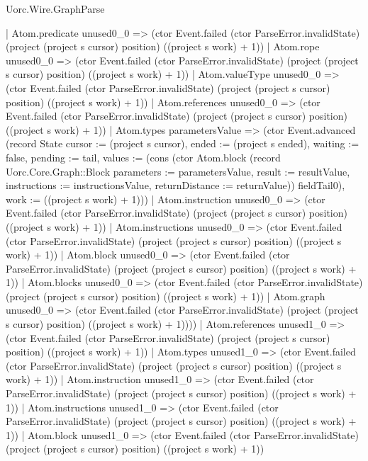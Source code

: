 \begin{lexlean}{Uorc.Wire.GraphParse}
\begin{semanticmodule}
{                      | Atom.predicate unused0_0 => (ctor Event.failed (ctor ParseError.invalidState) (project (project s cursor) position) ((project s work) + 1))
                      | Atom.rope unused0_0 => (ctor Event.failed (ctor ParseError.invalidState) (project (project s cursor) position) ((project s work) + 1))
                      | Atom.valueType unused0_0 => (ctor Event.failed (ctor ParseError.invalidState) (project (project s cursor) position) ((project s work) + 1))
                      | Atom.references unused0_0 => (ctor Event.failed (ctor ParseError.invalidState) (project (project s cursor) position) ((project s work) + 1))
                      | Atom.types parametersValue => (ctor Event.advanced (record State {cursor := (project s cursor), ended := (project s ended), waiting := false, pending := tail, values := (cons (ctor Atom.block (record Uorc.Core.Graph::Block {parameters := parametersValue, result := resultValue, instructions := instructionsValue, returnDistance := returnValue})) fieldTail0), work := ((project s work) + 1)}))
                      | Atom.instruction unused0_0 => (ctor Event.failed (ctor ParseError.invalidState) (project (project s cursor) position) ((project s work) + 1))
                      | Atom.instructions unused0_0 => (ctor Event.failed (ctor ParseError.invalidState) (project (project s cursor) position) ((project s work) + 1))
                      | Atom.block unused0_0 => (ctor Event.failed (ctor ParseError.invalidState) (project (project s cursor) position) ((project s work) + 1))
                      | Atom.blocks unused0_0 => (ctor Event.failed (ctor ParseError.invalidState) (project (project s cursor) position) ((project s work) + 1))
                      | Atom.graph unused0_0 => (ctor Event.failed (ctor ParseError.invalidState) (project (project s cursor) position) ((project s work) + 1))))
                  | Atom.references unused1_0 => (ctor Event.failed (ctor ParseError.invalidState) (project (project s cursor) position) ((project s work) + 1))
                  | Atom.types unused1_0 => (ctor Event.failed (ctor ParseError.invalidState) (project (project s cursor) position) ((project s work) + 1))
                  | Atom.instruction unused1_0 => (ctor Event.failed (ctor ParseError.invalidState) (project (project s cursor) position) ((project s work) + 1))
                  | Atom.instructions unused1_0 => (ctor Event.failed (ctor ParseError.invalidState) (project (project s cursor) position) ((project s work) + 1))
                  | Atom.block unused1_0 => (ctor Event.failed (ctor ParseError.invalidState) (project (project s cursor) position) ((project s work) + 1))
}
\end{semanticmodule}
\end{lexlean}
